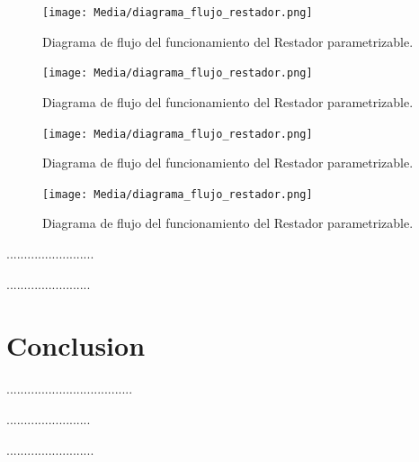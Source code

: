 \documentclass[journal]{IEEEtran}
\begin{document}
\begin{figure}[H]
    \centering
    \texttt{[image: Media/diagrama\_flujo\_restador.png]}
    \caption{Diagrama de flujo del funcionamiento del Restador parametrizable.}
    \label{fig:diagrama_flujo_restador}
\end{figure}
\begin{figure}[H]
    \centering
    \texttt{[image: Media/diagrama\_flujo\_restador.png]}
    \caption{Diagrama de flujo del funcionamiento del Restador parametrizable.}
    \label{fig:diagrama_flujo_restador}
\end{figure}
\begin{figure}[H]
    \centering
    \texttt{[image: Media/diagrama\_flujo\_restador.png]}
    \caption{Diagrama de flujo del funcionamiento del Restador parametrizable.}
    \label{fig:diagrama_flujo_restador}
\end{figure}
\begin{figure}[H]
    \centering
    \texttt{[image: Media/diagrama\_flujo\_restador.png]}
    \caption{Diagrama de flujo del funcionamiento del Restador parametrizable.}
    \label{fig:diagrama_flujo_restador}
\end{figure}

\par .........................
\par ........................


\section{Conclusion}
\par ....................................
\par ........................
\par .........................

\appendices
\end{document}
